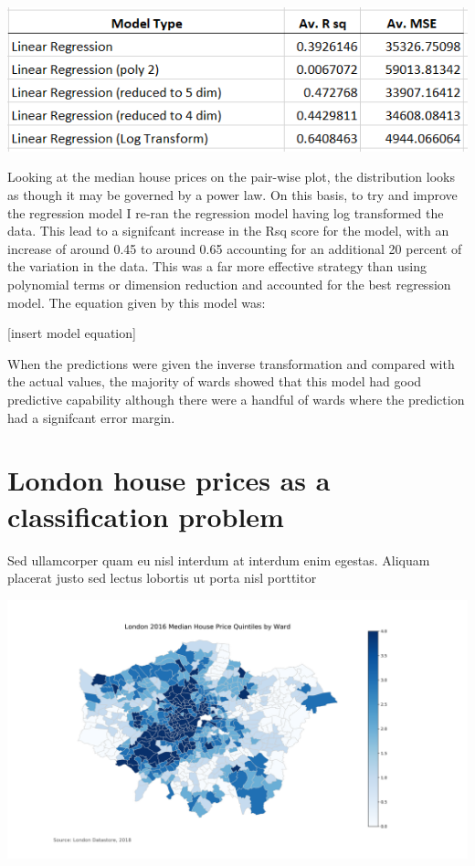\includegraphics[scale=1]{figures/regression_results} %

Looking at the median house prices on the pair-wise plot, the distribution looks as though it may be governed by a power law. On this basis, to try and improve the regression model I re-ran the regression model having log transformed the data. This lead to a signifcant increase in the Rsq score for the model, with an increase of around 0.45 to around 0.65 accounting for an additional 20 percent of the variation in the data. This was a far more effective strategy than using polynomial terms or dimension reduction and accounted for the best regression model. The equation given by this model was:

[insert model equation]

When the predictions were given the inverse transformation and compared with the actual values, the majority of wards showed that this model had good predictive capability although there were a handful of wards where the prediction had a signifcant error margin.  


\section{London house prices as a classification problem}

Sed ullamcorper quam eu nisl interdum at interdum enim egestas. Aliquam placerat justo sed lectus lobortis ut porta nisl porttitor

\includegraphics[scale=0.4]{figures/HPQuintile} %

